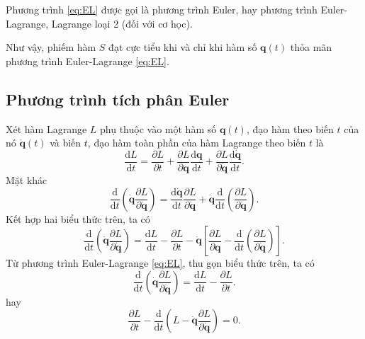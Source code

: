 Phương trình \eqref{eq:EL} được gọi là phương trình Euler, hay phương trình Euler-Lagrange, Lagrange loại 2 (đối với cơ học). 

Như vậy, phiếm hàm \(S\) đạt cực tiểu khi và chỉ khi hàm số \(\mathbf{q}(t)\) thỏa mãn phương trình Euler-Lagrange \eqref{eq:EL}.

\subsection{Phương trình tích phân Euler}

Xét hàm Lagrange \(L\) phụ thuộc vào một hàm số \(\mathbf{q}(t)\), đạo hàm theo biến \(t\) của nó \(\mathbf{\dot{q}}(t)\) và biến \(t\), đạo hàm toàn phần của hàm Lagrange theo biến \(t\) là
\begin{equation}
    \dfrac{\mathrm{d} L}{\mathrm{d} t} = \frac{\partial L}{\partial t} + \frac{\partial L}{\partial \mathbf{q}} \frac{\mathrm{d} \mathbf{q}}{\mathrm{d} t} + \frac{\partial L}{\partial \mathbf{\dot{q}}} \frac{\mathrm{d} \mathbf{\dot{q}}}{\mathrm{d} t}.
\end{equation}
Mặt khác
\begin{equation}
    \dfrac{\mathrm{d} }{\mathrm{d} t} \left( \mathbf{\dot{q}} \dfrac{\partial L}{\partial \mathbf{\dot{q}}} \right) = \dfrac{\mathrm{d} \mathbf{\dot{q}}}{\mathrm{d} t} \dfrac{\partial L}{\partial \mathbf{\dot{q}}} + \mathbf{\dot{q}} \dfrac{\mathrm{d}}{\mathrm{d} t} \left( \dfrac{\partial L}{\partial \mathbf{\dot{q}}} \right).
\end{equation}
Kết hợp hai biểu thức trên, ta có
\begin{equation}
    \dfrac{\mathrm{d} }{\mathrm{d} t} \left( \mathbf{\dot{q}} \dfrac{\partial L}{\partial \mathbf{\dot{q}}} \right) = \dfrac{\mathrm{d} L}{\mathrm{d} t} - \dfrac{\partial L}{\partial t} - \mathbf{\dot{q}} \left[ \dfrac{\partial L}{\partial \mathbf{q}} - \dfrac{\mathrm{d}}{\mathrm{d}t} \left( \dfrac{\partial L}{\partial \mathbf{\dot{q}}}\right) \right].
\end{equation}
Từ phương trình Euler-Lagrange \eqref{eq:EL}, thu gọn biểu thức trên, ta có
\begin{equation}
    \dfrac{\mathrm{d} }{\mathrm{d} t} \left( \mathbf{\dot{q}} \dfrac{\partial L}{\partial \mathbf{\dot{q}}} \right) = \dfrac{\mathrm{d} L}{\mathrm{d} t} - \dfrac{\partial L}{\partial t}.
\end{equation}
hay
\begin{equation}
    \dfrac{\partial L}{\partial t} - \dfrac{\mathrm{d} }{\mathrm{d} t} \left( L - \mathbf{\dot{q}} \dfrac{\partial L}{\partial \mathbf{\dot{q}}} \right) = 0.
\end{equation}


